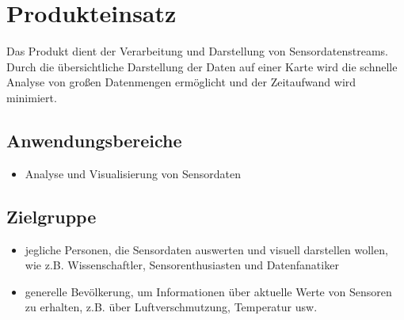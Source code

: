 \chapter{Produkteinsatz}
Das Produkt dient der Verarbeitung und Darstellung von Sensordatenstreams. Durch die übersichtliche Darstellung der Daten auf einer Karte wird die schnelle Analyse von großen Datenmengen ermöglicht und der Zeitaufwand wird minimiert.
\section{Anwendungsbereiche}
\begin{itemize}
	\item Analyse und Visualisierung von Sensordaten
\end{itemize}
\section{Zielgruppe}
\begin{itemize}
	\item jegliche Personen, die Sensordaten auswerten und visuell darstellen wollen, wie z.B. Wissenschaftler, Sensorenthusiasten und Datenfanatiker
	\item generelle Bevölkerung, um Informationen über aktuelle Werte von Sensoren zu erhalten, z.B. über Luftverschmutzung, Temperatur usw.
\end{itemize}
